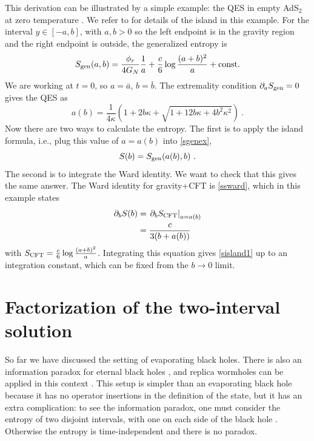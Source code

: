 \documentclass[12pt]{article}
\newcommand{\p}{\partial}
\newcommand{\f}{\frac}
\newcommand{\be}{\begin{equation}}
\newcommand{\ee}{\end{equation}}
\def\be{\begin{eqnarray}}
\def\ee{\end{eqnarray}}
\let\f=\frac
\def\be{\begin{equation}}
\def\ee{\end{equation}}
\renewcommand{\p}{\partial}
\numberwithin{equation}{section}
\def\p{{\phi}}
\def\be{\begin{equation}}
\def\ee{\end{equation}}
\def\f {\frac}
\def \be {\begin{equation}}
\def \ee {\end{equation}}
\renewcommand{\p}{\partial}
\begin{document}
\begin{spacing}{1.1}
This derivation can be illustrated by a simple example: the QES in empty AdS$_2$ at zero temperature \cite{Almheiri:2019yqk,Almheiri:2019qdq}. We refer to \cite[Section 4.1]{Almheiri:2019qdq} for details of the island in this example. For the interval $ y \in [-a,b]$, with $a,b>0$ so the left endpoint is in the gravity region and the right endpoint is outside, the generalized entropy is 
\be\label{sgenex}
S_{\rm gen}(a,b) =\f{\phi_r}{4G_N} \frac{1}{a} + \frac{c}{6} \log \frac{ (a+b)^2}{a}  + \mbox{const.} 
\ee
We are working at $t=0$, so $a=\bar{a}$, $b = \bar{b}$. The extremality condition $\p_a S_{\rm gen} = 0$ gives the QES as
\be
a(b) =   \frac{1}{4\kappa}(1 +2 b\kappa + \sqrt{1+  12b\kappa +4 b^2 \kappa^2} ) \ .
\ee
Now there are two ways to calculate the entropy. The first is to apply the island formula, i.e., plug this value of $a = a(b)$ into \eqref{sgenex}, 
\be\label{sisland1}
S(b) = S_{\rm gen}(a(b), b) \ .
\ee
The second is to integrate the Ward identity. We want to check that this gives the same answer. The Ward identity for gravity+CFT is \eqref{ssward}, which in this example states
\begin{align}
\p_b S(b) &=\left. \p_b S_{\rm CFT}\right|_{a=a(b)}\\
&= \frac{c}{3(b + a(b))} \notag
\end{align}
with $S_{\rm CFT} = \frac{c}{6}  \log \frac{ (a+b)^2}{a}$. 
Integrating this equation gives \eqref{sisland1} up to an integration constant, which can be fixed from the $b\to 0$ limit. 




 


 
 \section{Factorization of the two-interval solution} \label{sec:fac}
 

So far we have discussed the setting of evaporating black holes. There is also an information paradox for eternal black holes \cite{Almheiri:2019yqk}, and replica wormholes can be applied in this context \cite{Almheiri:2019qdq}. This setup is simpler than an evaporating black hole because it has no operator insertions in the definition of the state, but it has an extra complication: to see the information paradox, one must consider the entropy of two disjoint intervals, with one on each side of the black hole \cite{Almheiri:2019yqk}. Otherwise the entropy is time-independent and there is no paradox.


\end{spacing}
\end{document}
